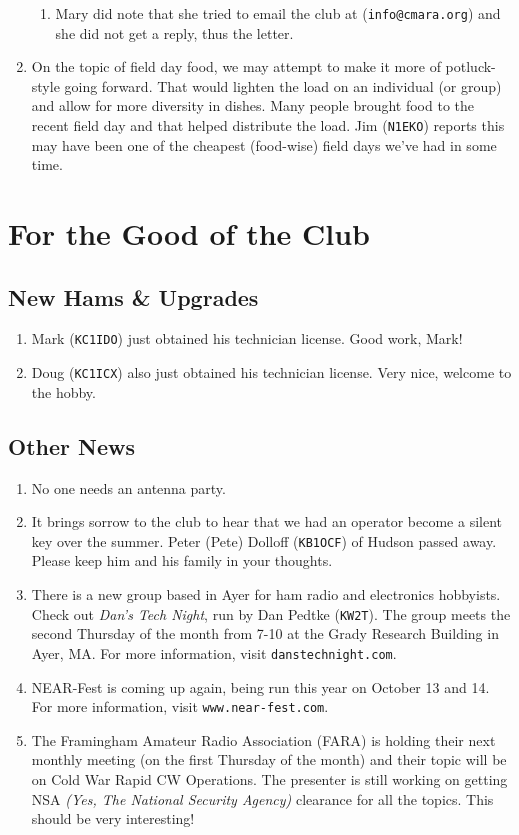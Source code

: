 \documentclass[10pt,letterpaper]{article}
\begin{document}
\begin{enumerate}
\begin{enumerate}
    \item Mary did note that she tried to email the club at (\texttt{info@cmara.org}) and she did not get a reply, thus the letter.
  \end{enumerate}
  \item On the topic of field day food, we may attempt to make it more of potluck-style going forward. That would lighten the load on an individual (or group) and allow for more diversity in dishes. Many people brought food to the recent field day and that helped distribute the load. Jim (\texttt{N1EKO}) reports this may have been one of the cheapest (food-wise) field days we've had in some time.
\end{enumerate}

\section{For the Good of the Club}

\subsection{New Hams \& Upgrades}
\begin{enumerate}
  \item Mark (\texttt{KC1IDO}) just obtained his technician license. Good work, Mark!
  \item Doug (\texttt{KC1ICX}) also just obtained his technician license. Very nice, welcome to the hobby.
\end{enumerate}

\subsection{Other News}
\begin{enumerate}
  \item No one needs an antenna party.
  \item It brings sorrow to the club to hear that we had an operator become a silent key over the summer. Peter (Pete) Dolloff (\texttt{KB1OCF}) of Hudson passed away. Please keep him and his family in your thoughts.
  \item There is a new group based in Ayer for ham radio and electronics hobbyists. Check out \emph{Dan's Tech Night}, run by Dan Pedtke (\texttt{KW2T}). The group meets the second Thursday of the month from 7-10 at the Grady Research Building in Ayer, MA. For more information, visit \texttt{danstechnight.com}.
  \item NEAR-Fest is coming up again, being run this year on October 13 and 14. For more information, visit \texttt{www.near-fest.com}.
  \item The Framingham Amateur Radio Association (FARA) is holding their next monthly meeting (on the first Thursday of the month) and their topic will be on Cold War Rapid CW Operations. The presenter is still working on getting NSA \emph{(Yes, The National Security Agency)} clearance for all the topics. This should be very interesting!
\end{enumerate}
\end{document}
